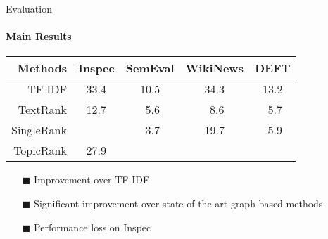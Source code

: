   \begin{frame}[label=main_results]{Evaluation}
    \framesubtitle{\hyperlink{main_results_backup}{Main Results}}
    
    \begin{center}
      \begin{tabular}{rcccc}
        \toprule
        Methods & Inspec & SemEval & WikiNews & DEFT\\
        \midrule
        TF-IDF & 33.4 & 10.5 & 34.3 & 13.2\\
        TextRank & 12.7 & $~~$5.6 & $~~$8.6 & $~~$5.7\\
        SingleRank & \cellcolor{pink}{35.2} & $~~$3.7 & 19.7 & $~~$5.9\\
        TopicRank & 27.9 & \cellcolor{pink}{12.1} & \cellcolor{pink}{35.6} & \cellcolor{pink}{15.1}\\
        \bottomrule
      \end{tabular}
    \end{center}

    \begin{itemize}
      \item[\footnotesize\color{green}$\blacksquare$]{Improvement over TF-IDF}
      \item[\footnotesize\color{green}$\blacksquare$]{Significant improvement
                                                      over state-of-the-art
                                                      graph-based methods}
      \item[\footnotesize\color{red}$\blacksquare$]{Performance loss on Inspec}
    \end{itemize}
  \end{frame}

